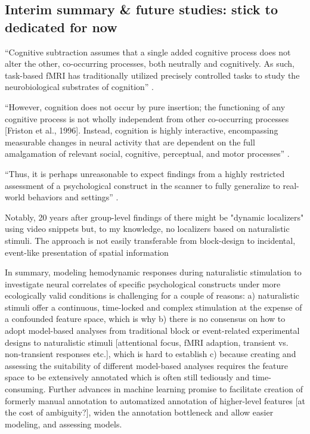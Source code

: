 \subsection{Interim summary \& future studies: stick to dedicated for now}




``Cognitive subtraction assumes that a single added cognitive process does not
alter the other, co-occurring processes, both neutrally and cognitively.
%
As such, task-based fMRI has traditionally utilized precisely controlled tasks
to study the neurobiological substrates of cognition''
\citep{bottenhorn2018cooperating}.

%
``However, cognition does not occur by pure insertion;
%
the functioning of any cognitive process is not wholly independent from other
co-occurring processes [Friston et al., 1996].
%
Instead, cognition is highly interactive, encompassing measurable changes in
neural activity that are dependent on the full amalgamation of relevant social,
cognitive, perceptual, and motor processes'' \citep{bottenhorn2018cooperating}.

%
``Thus, it is perhaps unreasonable to expect findings from a highly restricted
assessment of a psychological construct in the scanner to fully generalize to
real-world behaviors and settings'' \citep{bottenhorn2018cooperating}.




%
Notably, 20 years after group-level findings of \citep{bartels2004mapping} there
might be "dynamic localizers" using video snippets
\citep{pitcher2011differential, fox2009defining} but, to my knowledge, no
localizers based on naturalistic stimuli.
%
The approach is not easily transferable from block-design to incidental,
event-like presentation of spatial information


In summary, modeling hemodynamic responses during naturalistic stimulation to
investigate neural correlates of specific psychological constructs under more
ecologically valid conditions is challenging for a couple of reasons:
%
a) naturalistic stimuli offer a continuous, time-locked and complex stimulation
at the expense of a confounded feature space, which is why
%
b) there is no consensus on how to adopt model-based analyses from traditional
block or event-related experimental designs to naturalistic stimuli [attentional
focus, fMRI adaption, transient vs. non-transient responses etc.], which is hard
to establish
%
c) because creating and assessing the suitability of different model-based
analyses requires the feature space to be extensively annotated which is often
still tediously and time-consuming.
%
Further advances in machine learning promise to facilitate creation of formerly
manual annotation to automatized annotation of higher-level features [at the
cost of ambiguity?], widen the annotation bottleneck and allow easier modeling,
and assessing models.

